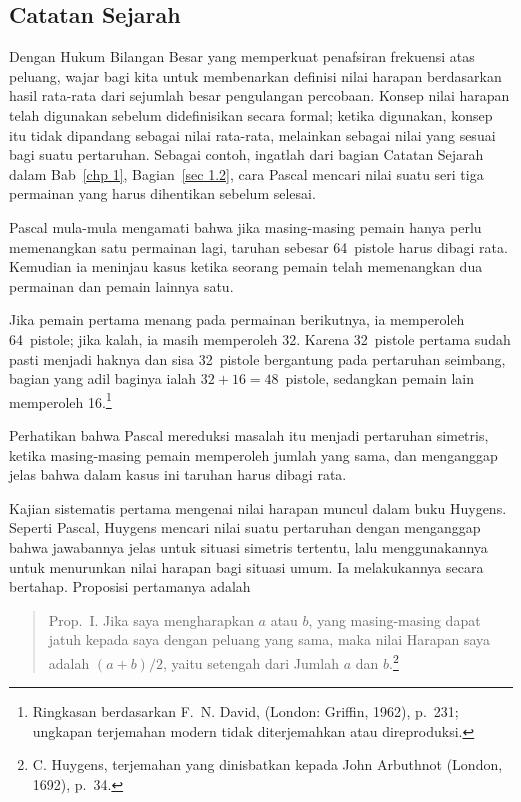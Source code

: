 \subsection*{Catatan Sejarah}

Dengan Hukum Bilangan Besar yang memperkuat penafsiran frekuensi atas peluang, wajar
bagi kita untuk membenarkan definisi nilai harapan berdasarkan hasil rata-rata dari
sejumlah besar pengulangan percobaan. Konsep nilai harapan telah digunakan sebelum
didefinisikan secara formal; ketika digunakan, konsep itu tidak dipandang sebagai
nilai rata-rata, melainkan sebagai nilai yang sesuai bagi suatu pertaruhan. Sebagai
contoh, ingatlah dari bagian Catatan Sejarah dalam Bab~\ref{chp 1},
Bagian~\ref{sec 1.2}, cara Pascal mencari nilai suatu seri tiga permainan yang harus
dihentikan sebelum selesai.
\par
Pascal mula-mula mengamati bahwa jika masing-masing pemain hanya
perlu memenangkan satu permainan lagi, taruhan sebesar 64~pistole harus dibagi rata.
Kemudian ia meninjau kasus ketika seorang pemain telah memenangkan dua permainan dan
pemain lainnya satu.

Jika pemain pertama menang pada permainan berikutnya, ia memperoleh 64~pistole; jika
kalah, ia masih memperoleh 32. Karena 32~pistole pertama sudah pasti menjadi haknya dan
sisa 32~pistole bergantung pada pertaruhan seimbang, bagian yang adil baginya ialah
$32+16=48$~pistole, sedangkan pemain lain memperoleh 16.\footnote{Ringkasan berdasarkan
F.~N. David,  (London: Griffin, 1962), p.~231;
ungkapan terjemahan modern tidak diterjemahkan atau direproduksi.}

Perhatikan bahwa Pascal mereduksi masalah itu menjadi pertaruhan simetris, ketika
masing-masing pemain memperoleh jumlah yang sama, dan menganggap jelas bahwa dalam
kasus ini taruhan harus dibagi rata.

Kajian sistematis pertama mengenai nilai harapan muncul dalam buku
Huygens. Seperti Pascal, Huygens mencari nilai suatu pertaruhan
dengan menganggap bahwa jawabannya jelas untuk situasi simetris tertentu, lalu
menggunakannya untuk menurunkan nilai harapan bagi situasi umum. Ia melakukannya
secara bertahap. Proposisi pertamanya adalah

\begin{quote} Prop.~I. Jika saya mengharapkan $a$ atau $b$, yang masing-masing dapat
jatuh kepada saya dengan peluang yang sama, maka nilai Harapan saya adalah
$(a + b)/2$, yaitu setengah dari Jumlah $a$ dan $b$.\footnote{C. Huygens,
 terjemahan yang dinisbatkan kepada John
Arbuthnot (London, 1692), p.~34.}
\end{quote}

